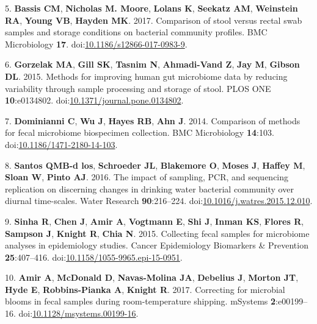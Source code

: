 \documentclass[11pt,]{article}
\begin{document}
\leavevmode\hypertarget{ref-Bassis2017}{}%
5. \textbf{Bassis CM}, \textbf{Nicholas M. Moore}, \textbf{Lolans K},
\textbf{Seekatz AM}, \textbf{Weinstein RA}, \textbf{Young VB},
\textbf{Hayden MK}. 2017. Comparison of stool versus rectal swab samples
and storage conditions on bacterial community profiles. BMC Microbiology
\textbf{17}.
doi:\href{https://doi.org/10.1186/s12866-017-0983-9}{10.1186/s12866-017-0983-9}.

\leavevmode\hypertarget{ref-Gorzelak2015}{}%
6. \textbf{Gorzelak MA}, \textbf{Gill SK}, \textbf{Tasnim N},
\textbf{Ahmadi-Vand Z}, \textbf{Jay M}, \textbf{Gibson DL}. 2015.
Methods for improving human gut microbiome data by reducing variability
through sample processing and storage of stool. PLOS ONE
\textbf{10}:e0134802.
doi:\href{https://doi.org/10.1371/journal.pone.0134802}{10.1371/journal.pone.0134802}.

\leavevmode\hypertarget{ref-Dominianni2014}{}%
7. \textbf{Dominianni C}, \textbf{Wu J}, \textbf{Hayes RB}, \textbf{Ahn
J}. 2014. Comparison of methods for fecal microbiome biospecimen
collection. BMC Microbiology \textbf{14}:103.
doi:\href{https://doi.org/10.1186/1471-2180-14-103}{10.1186/1471-2180-14-103}.

\leavevmode\hypertarget{ref-BautistadelosSantos2016}{}%
8. \textbf{Santos QMB-d los}, \textbf{Schroeder JL}, \textbf{Blakemore
O}, \textbf{Moses J}, \textbf{Haffey M}, \textbf{Sloan W}, \textbf{Pinto
AJ}. 2016. The impact of sampling, PCR, and sequencing replication on
discerning changes in drinking water bacterial community over diurnal
time-scales. Water Research \textbf{90}:216--224.
doi:\href{https://doi.org/10.1016/j.watres.2015.12.010}{10.1016/j.watres.2015.12.010}.

\leavevmode\hypertarget{ref-Sinha2015}{}%
9. \textbf{Sinha R}, \textbf{Chen J}, \textbf{Amir A}, \textbf{Vogtmann
E}, \textbf{Shi J}, \textbf{Inman KS}, \textbf{Flores R},
\textbf{Sampson J}, \textbf{Knight R}, \textbf{Chia N}. 2015. Collecting
fecal samples for microbiome analyses in epidemiology studies. Cancer
Epidemiology Biomarkers \& Prevention \textbf{25}:407--416.
doi:\href{https://doi.org/10.1158/1055-9965.epi-15-0951}{10.1158/1055-9965.epi-15-0951}.

\leavevmode\hypertarget{ref-Amir2017b}{}%
10. \textbf{Amir A}, \textbf{McDonald D}, \textbf{Navas-Molina JA},
\textbf{Debelius J}, \textbf{Morton JT}, \textbf{Hyde E},
\textbf{Robbins-Pianka A}, \textbf{Knight R}. 2017. Correcting for
microbial blooms in fecal samples during room-temperature shipping.
mSystems \textbf{2}:e00199--16.
doi:\href{https://doi.org/10.1128/msystems.00199-16}{10.1128/msystems.00199-16}.
\end{document}
